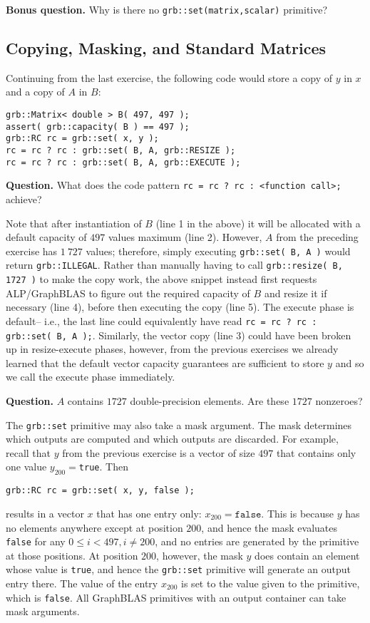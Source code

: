 \noindent \textbf{Bonus question.} Why is there no \texttt{grb::set(matrix,scalar)} primitive?

\subsection{Copying, Masking, and Standard Matrices}

Continuing from the last exercise, the following code would store a copy of $y$ in $x$ and a copy of $A$ in $B$:
\begin{lstlisting}
grb::Matrix< double > B( 497, 497 );
assert( grb::capacity( B ) == 497 );
grb::RC rc = grb::set( x, y );
rc = rc ? rc : grb::set( B, A, grb::RESIZE );
rc = rc ? rc : grb::set( B, A, grb::EXECUTE );
\end{lstlisting}
\noindent \textbf{Question.} What does the code pattern \texttt{rc = rc ? rc : <function call>;} achieve?

Note that after instantiation of $B$ (line 1 in the above) it will be allocated with a default capacity of $497$ values maximum (line 2). However, $A$ from the preceding exercise has $1\ 727$ values; therefore, simply executing \texttt{grb::set( B, A )} would return \texttt{grb::ILLEGAL}. Rather than manually having to call \texttt{grb::resize( B, 1727 )} to make the copy work, the above snippet instead first requests ALP/GraphBLAS to figure out the required capacity of $B$ and resize it if necessary (line 4), before then executing the copy (line 5). The execute phase is default-- i.e., the last line could equivalently have read \texttt{rc = rc ? rc : grb::set( B, A );}. Similarly, the vector copy (line 3) could have been broken up in resize-execute phases, however, from the previous exercises we already learned that the default vector capacity guarantees are sufficient to store $y$ and so we call the execute phase immediately.

\noindent \textbf{Question.} $A$ contains $1727$ double-precision elements. Are these $1727$ nonzeroes?

The \texttt{grb::set} primitive may also take a mask argument. The mask determines which outputs are computed and which outputs are discarded. For example, recall that $y$ from the previous exercise is a vector of size $497$ that contains only one value $y_{200}=$\texttt{true}. Then
\begin{lstlisting}
grb::RC rc = grb::set( x, y, false );
\end{lstlisting}
results in a vector $x$ that has one entry only: $x_{200}=\texttt{false}$. This is because $y$ has no elements anywhere except at position $200$, and hence the mask evaluates \texttt{false} for any $0\leq i<497, i\neq200$, and no entries are generated by the primitive at those positions. At position $200$, however, the mask $y$ does contain an element whose value is \texttt{true}, and hence the \texttt{grb::set} primitive will generate an output entry there. The value of the entry $x_{200}$ is set to the value given to the primitive, which is \texttt{false}. All GraphBLAS primitives with an output container can take mask arguments.

